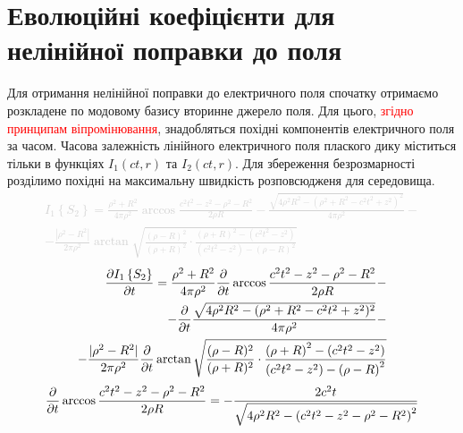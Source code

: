 \section{Еволюційні коефіцієнти для нелінійної поправки до поля}
%
Для отримання нелінійної поправки до електричного поля спочатку отримаємо
розкладене по модовому базису вторинне джерело поля. Для цього, 
\textcolor{red}{згідно принципам віпромінювання}, знадобляться 
похідні компонентів електричного поля за часом. Часова залежність лінійного
електричного поля плаского дику міститься тільки в функціях 
$ I_1(ct,r) $ та $ I_2(ct,r) $. Для збереження безрозмарності розділимо
похідні на максимальну швидкість розповсюдженя для середовища.
%
\textcolor{lightgray}{ \begin{equation*} \begin{aligned}
I_1 \left\{ S_2 \right\} = \frac{\rho^2 + R^2}{4 \pi \rho^2} \arccos 
\frac{c^2 t^2 - z^2 - \rho^2 - R^2}{2 \rho R}  -
\frac{\sqrt{4 \rho^2 R^2 - (\rho^2 + R^2 - c^2t^2 + z^2)^2}}{4 \pi \rho^2} - \\
- \frac{ |\rho^2 - R^2| }{2 \pi \rho^2} 
\arctan \sqrt{ \frac{(\rho - R)^2}{(\rho + R)^2} \cdot
\frac{\left( \rho + R \right)^2 - \left( c^2t^2 - z^2 \right)} 
{\left( c^2t^2 - z^2 \right) - \left( \rho - R \right)^2} }
\end{aligned} \end{equation*} }
%
\textcolor{lightgray}{ \begin{equation*} \begin{aligned}
\frac{\partial I_1 \left\{ S_2 \right\}}{\partial t} = \frac{\rho^2 + R^2}{4 \pi \rho^2}
\frac{\partial }{\partial t} \arccos \frac{c^2 t^2 - z^2 - \rho^2 - R^2}{2 \rho R} - \\
- \frac{\partial }{\partial t} \frac{\sqrt{4 \rho^2 R^2 - (\rho^2 + R^2 - c^2t^2 + z^2)^2}}
{4 \pi \rho^2} - \\ - \frac{ |\rho^2 - R^2| }{2 \pi \rho^2} \frac{\partial }{\partial t} 
\arctan \sqrt{ \frac{(\rho - R)^2}{(\rho + R)^2} \cdot
\frac{\left( \rho + R \right)^2 - \left( c^2t^2 - z^2 \right)} 
{\left( c^2t^2 - z^2 \right) - \left( \rho - R \right)^2} }
\end{aligned} \end{equation*} }
%
\textcolor{lightgray}{ \begin{equation*} \begin{aligned}
\frac{\partial }{\partial t} \arccos \frac{c^2 t^2 - z^2 - \rho^2 - R^2}{2 \rho R} = 
- \frac{2 c^2 t}
{ \sqrt{4 \rho^2 R^2 - \left(c^2 t^2 - z^2 - \rho^2 - R^2 \right)^2} }
\end{aligned} \end{equation*} }

